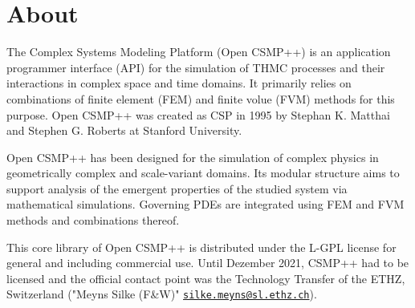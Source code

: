 \chapter{About }
\hypertarget{index}{}\label{index}
The Complex Systems Modeling Platform (Open CSMP++) is an application programmer interface (API) for the simulation of THMC processes and their interactions in complex space and time domains. It primarily relies on combinations of finite element (FEM) and finite volue (FVM) methods for this purpose. Open CSMP++ was created as CSP in 1995 by Stephan K. Matthai and Stephen G. Roberts at Stanford University.

Open CSMP++ has been designed for the simulation of complex physics in geometrically complex and scale-\/variant domains. Its modular structure aims to support analysis of the emergent properties of the studied system via mathematical simulations. Governing PDEs are integrated using FEM and FVM methods and combinations thereof.

This core library of Open CSMP++ is distributed under the L-\/\+GPL license for general and including commercial use. Until Dezember 2021, CSMP++ had to be licensed and the official contact point was the Technology Transfer of the ETHZ, Switzerland ("{}\+Meyns Silke (\+F\&\+W)"{} \href{mailto:silke.meyns@sl.ethz.ch}{\texttt{silke.\+meyns@sl.\+ethz.\+ch}}). 
